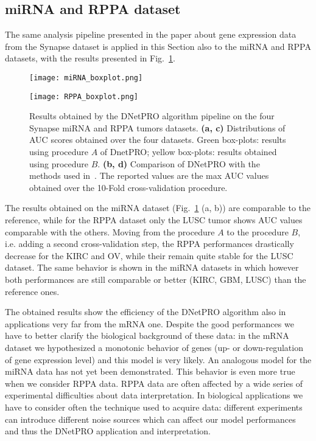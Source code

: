 \documentclass{standalone}
\begin{document}
\subsection[miRNA and RPPA data]{miRNA and RPPA dataset}\label{synapse:miRNA}

The same analysis pipeline presented in the paper about gene expression data from the Synapse dataset is applied in this Section also to the miRNA and RPPA datasets, with the results presented in Fig.~\ref{fig:other_results}.

\begin{figure}[htbp]
\centering
\texttt{[image: miRNA\_boxplot.png]}
\qquad
\def\svgwidth{0.45\textwidth}

\newline
\texttt{[image: RPPA\_boxplot.png]}
\qquad
\centering
\def\svgwidth{0.45\textwidth}

\caption{Results obtained by the \textsf{DNetPRO} algorithm pipeline on the four Synapse miRNA and RPPA tumors datasets.
\textbf{(a, c)} Distributions of AUC scores obtained over the four datasets.
Green box-plots: results using procedure $A$ of DnetPRO; yellow box-plots: results obtained using procedure $B$.
\textbf{(b, d)} Comparison of \textsf{DNetPRO} with the methods used in~\cite{Yuan2014}.
The reported values are the max AUC values obtained over the 10-Fold cross-validation procedure.
}
\label{fig:other_results}
\end{figure}

The results obtained on the miRNA dataset (Fig.~\ref{fig:other_results} (a, b)) are comparable to the reference, while for the RPPA dataset only the LUSC tumor shows AUC values comparable with the others.
Moving from the procedure $A$ to the procedure $B$, i.e. adding a second cross-validation step, the RPPA performances drastically decrease for the KIRC and OV, while their remain quite stable for the LUSC dataset.
The same behavior is shown in the miRNA datasets in which however both performances are still comparable or better (KIRC, GBM, LUSC) than the reference ones.

The obtained results show the efficiency of the DNetPRO algorithm also in applications very far from the mRNA one.
Despite the good performances we have to better clarify the biological background of these data: in the mRNA dataset we hypothesized a monotonic behavior of genes (up- or down-regulation of gene expression level) and this model is very likely.
An analogous model for the miRNA data has not yet been demonstrated.
This behavior is even more true when we consider RPPA data.
RPPA data are often affected by a wide series of experimental difficulties about data interpretation.
In biological applications we have to consider often the technique used to acquire data: different experiments can introduce different noise sources which can affect our model performances and thus the DNetPRO application and interpretation.
\end{document}
